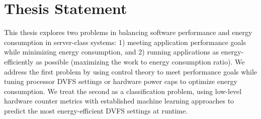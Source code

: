 \section{Thesis Statement}

This thesis explores two problems in balancing software performance and energy consumption in server-class systems: 1) meeting application performance goals while minimizing energy consumption, and 2) running applications as energy-efficiently as possible (maximizing the work to energy consumption ratio).
We address the first problem by using control theory to meet performance goals while tuning processor DVFS settings or hardware power caps to optimize energy consumption.
We treat the second as a classification problem, using low-level hardware counter metrics with established machine learning approaches to predict the most energy-efficient DVFS settings at runtime.
